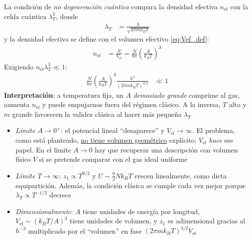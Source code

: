 \documentclass{article}
\begin{document}
La condición de \textit{no degeneración cuántica} compara la densidad efectiva $n_{\text{ef}}$ con la celda cuántica $\lambda_T^3$, donde
\begin{equation}
\begin{split}
\lambda_T
&= \frac{h}{\sqrt{2\pi m k_B T}}
\end{split}\label{eq:lambda_termica}
\end{equation}
y la densidad efectiva se define con el volumen efectivo \eqref{eq:Vef_def}:
\begin{equation}
\begin{split}
n_{\text{ef}}
&= \frac{N}{V_{\text{ef}}}
= \frac{N}{8\pi}\left(\frac{A}{k_B T}\right)^3
\end{split}\label{eq:n_ef_def}
\end{equation}
Exigiendo $n_{\text{ef}}\lambda_T^3\ll 1$:
\begin{equation}
\begin{split}
\frac{N}{8\pi}\left(\frac{A}{k_B T}\right)^3
\frac{h^3}{(2\pi m k_B T)^{3/2}}
&\ll 1
\end{split}\label{eq:criterio_clasico_final}
\end{equation}
\textbf{Interpretación}: a temperatura fija, un $A$ \textit{demasiado grande} comprime al gas, aumenta $n_{\text{ef}}$ y puede empujarnos fuera del régimen clásico. A la inversa, $T$ alto y $m$ grande favorecen la validez clásica al hacer más pequeña $\lambda_T$


\begin{itemize}
\item[$\bullet$] \textit{Límite $A\to 0^+$}: el potencial lineal “desaparece” y $V_{\text{ef}}\to\infty$. El problema, como está planteado, \underline{no tiene volumen geométrico} explícito; $V_{\text{ef}}$ \textit{hace} ese papel. En el límite $A\to 0$ hay que recuperar una descripción con volumen físico $V$ si se pretende comparar con el gas ideal uniforme
\item[$\bullet$] \textit{Límite $T\to\infty$}: $z_1\propto T^{9/2}$ y $U\sim \tfrac{9}{2}Nk_B T$ crecen linealmente, como dicta equipartición. Además, la condición clásica se cumple cada vez mejor porque $\lambda_T\propto T^{-1/2}$ decrece
\item[$\bullet$] \textit{Dimensionalmente}: $A$ tiene unidades de energía por longitud, $V_{\text{ef}}\sim (k_B T/A)^3$ tiene unidades de volumen, y $z_1$ es adimensional gracias al $h^{-3}$ multiplicado por el “volumen” en fase $(2\pi m k_B T)^{3/2}V_{\text{ef}}$
\end{itemize}
\end{document}
